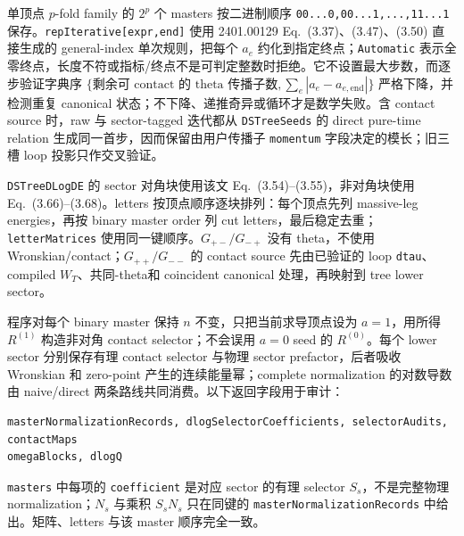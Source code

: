 ﻿\documentclass[a4paper,11pt]{article}
\begin{document}
单顶点 $p$-fold family 的 $2^p$ 个 masters 按二进制顺序 \texttt{00...0,00...1,...,11...1} 保存。\texttt{repIterative[expr,end]} 使用 2401.00129 Eq.~(3.37)、(3.47)、(3.50) 直接生成的 general-index 单次规则，把每个 $a_e$ 约化到指定终点；\texttt{Automatic} 表示全零终点，长度不符或指标/终点不是可判定整数时拒绝。它不设置最大步数，而逐步验证字典序
$\{\text{剩余可 contact 的 theta 传播子数},\sum_e|a_e-a_{e,\mathrm{end}}|\}$ 严格下降，并检测重复 canonical 状态；不下降、递推奇异或循环才是数学失败。含 contact source 时，raw 与 sector-tagged 迭代都从 \texttt{DSTreeSeeds} 的 direct pure-time relation 生成同一首步，因而保留由用户传播子 \texttt{momentum} 字段决定的模长；旧三槽 loop 投影只作交叉验证。

\texttt{DSTreeDLogDE} 的 sector 对角块使用该文 Eq.~(3.54)--(3.55)，非对角块使用 Eq.~(3.66)--(3.68)。letters 按顶点顺序逐块排列：每个顶点先列 massive-leg energies，再按 binary master order 列 cut letters，最后稳定去重；\texttt{letterMatrices} 使用同一键顺序。$G_{+-}/G_{-+}$ 没有 theta，不使用 Wronskian/contact；$G_{++}/G_{--}$ 的 contact source 先由已验证的 loop \texttt{dtau}、compiled $W_T$、共同-theta和 coincident canonical 处理，再映射到 tree lower sector。

程序对每个 binary master 保持 $n$ 不变，只把当前求导顶点设为 $a=1$，用所得 $R^{(1)}$ 构造非对角 contact selector；不会误用 $a=0$ seed 的 $R^{(0)}$。每个 lower sector 分别保存有理 contact selector 与物理 sector prefactor，后者吸收 Wronskian 和 zero-point 产生的连续能量幂；complete normalization 的对数导数由 naive/direct 两条路线共同消费。以下返回字段用于审计：
\begin{verbatim}
masterNormalizationRecords, dlogSelectorCoefficients, selectorAudits, contactMaps
omegaBlocks, dlogQ
\end{verbatim}
\texttt{masters} 中每项的 \texttt{coefficient} 是对应 sector 的有理 selector $S_s$，不是完整物理 normalization；$N_s$ 与乘积 $S_sN_s$ 只在同键的 \texttt{masterNormalizationRecords} 中给出。矩阵、letters 与该 master 顺序完全一致。
\end{document}
